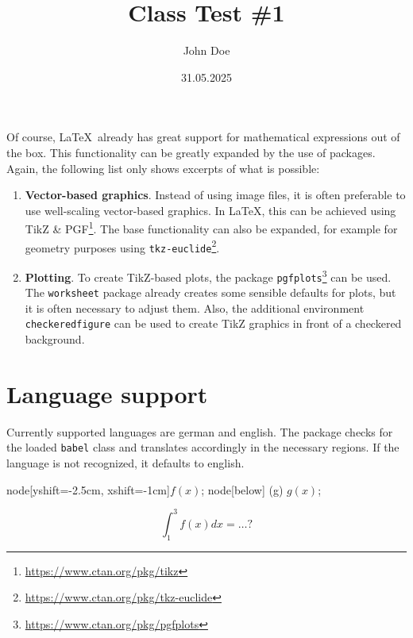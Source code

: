 \documentclass[11pt, a4paper, oneside]{article}
\begin{document}
	Of course, \LaTeX\ already has great support for mathematical expressions out of the box.
	This functionality can be greatly expanded by the use of packages.
	Again, the following list only shows excerpts of what is possible:
	\begin{enumerate}
		\item \textbf{Vector-based graphics}.
		Instead of using image files, it is often preferable to use well-scaling vector-based graphics.
		In \LaTeX, this can be achieved using TikZ \& PGF\footnote{\url{https://www.ctan.org/pkg/tikz}}.
		The base functionality can also be expanded, for example for geometry purposes using \texttt{tkz-euclide}\footnote{\url{https://www.ctan.org/pkg/tkz-euclide}}.
		\item \textbf{Plotting}.
		To create TikZ-based plots, the package \texttt{pgfplots}\footnote{\url{https://www.ctan.org/pkg/pgfplots}} can be used.
		The \texttt{worksheet} package already creates some sensible defaults for plots, but it is often necessary to adjust them.
		Also, the additional environment \texttt{checkeredfigure} can be used to create TikZ graphics in front of a checkered background.
	\end{enumerate}
	
	\section*{Language support}
	
	Currently supported languages are german and english.
	The package checks for the loaded \texttt{babel} class and translates accordingly in the necessary regions.
	If the language is not recognized, it defaults to english.
	
	\pagebreak
	
	\author{John Doe}
	\title{Class Test \#1}
	\subject{Mathematics}
	\date{31.05.2025}
	\maketitle

	
	\lipsum[1]
	
	\checkered
	
	
	\lipsum[2]
	\begin{plot}
		 node[yshift=-2.5cm, xshift=-1cm]{$f(x)$};
		 node[below] (g) {$g(x)$};
	\end{plot}
	$$\int_{1}^{3} f(x) dx = \dots?$$
	\boxarea[3cm]
	
\end{document}
